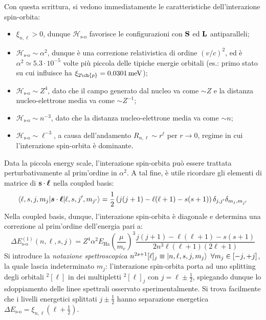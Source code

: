 Con questa scrittura, si vedono immediatamente le caratteristiche dell'interazione spin-orbita:
\begin{itemize}
	\item $ \xi_{n,\ell} > 0 $, dunque $ \mathcal{H}_\text{s-o} $ favorisce le configurazioni con $ \mathbf{S} $ ed $ \mathbf{L} $ antiparalleli;
	\item $ \mathcal{H}_\text{s-o} \sim \alpha^2 $, dunque è una correzione relativistica di ordine $ (v/c)^2 $, ed è $ \alpha^2 \simeq 5.3 \cdot 10^{-5} $ volte più piccola delle tipiche energie orbitali (es.: primo stato su cui influisce ha $ \xi_{2\ch{p}} = 0.0301 \,\text{meV} $);
	\item $ \mathcal{H}_\text{s-o} \sim Z^4 $, dato che il campo generato dal nucleo va come $ \sim Z $ e la distanza nucleo-elettrone media va come $ \sim Z^{-1} $;
	\item $ \mathcal{H}_\text{s-o} \sim n^{-3} $, dato che la distanza nucleo-elettrone media va come $ \sim n $;
	\item $ \mathcal{H}_\text{s-o} \sim \ell^{-3} $, a causa dell'andamento $ R_{n,\ell} \sim r^\ell $ per $ r \rightarrow 0 $, regime in cui l'interazione spin-orbita è dominante.
\end{itemize}
Data la piccola energy scale, l'interazione spin-orbita può essere trattata perturbativamente al prim'ordine in $ \alpha^2 $. A tal fine, è utile ricordare gli elementi di matrice di $ \mathbf{s} \cdot \boldsymbol{\ell} $ nella coupled basis:
\begin{equation}
	\braket{\ell,s,j,m_j | \boldsymbol{s} \cdot \boldsymbol{\ell} | \ell,s,j',m_{j'}} = \frac{1}{2} \left( j(j + 1) - \ell (\ell + 1) - s(s + 1) \right) \delta_{j,j'} \delta_{m_j, m_{j'}}
	\label{eq:sl-coupled-basis}
\end{equation}
Nella coupled basis, dunque, l'interazione spin-orbita è diagonale e determina una correzione al prim'ordine dell'energia pari a:
\begin{equation}
	\Delta E^{(1)}_\text{s-o}(n,\ell,s,j) = Z^4 \alpha^2 E_\text{Ha} \left( \frac{\mu}{m_e} \right)^3 \frac{j(j + 1) - \ell(\ell + 1) - s(s + 1)}{2n^3 \ell (\ell + 1) (2\ell + 1)}
	\label{eq:spin-orbit-spectr}
\end{equation}
Si introduce la \textit{notazione spettroscopica} $ n ^{2s+1} [\ell] _j \equiv \ket{n,\ell,s,j, m_j} \,\,\forall m_j \in [-j,+j] $, la quale lascia indeterminato $ m_j $: l'interazione spin-orbita porta ad uno splitting degli orbitali $ ^{2}[\ell] $ in dei multipletti $ ^{2}[\ell]_j $ con $ j = \ell \pm \frac{1}{2} $, spiegando dunque lo sdoppiamento delle linee spettrali osservato sperimentalmente. Si trova facilmente che i livelli energetici splittati $ j \pm \frac{1}{2} $ hanno separazione energetica $ \Delta E_\text{s-o} = \xi_{n,\ell} \left( \ell + \frac{1}{2} \right) $.

